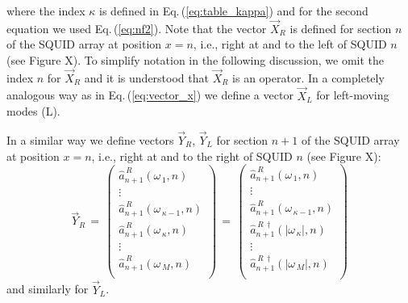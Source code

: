 %
where the index $\kappa$ is defined in Eq.\,(\ref{eq:table_kappa}) and for the second equation we used
Eq.\,(\ref{eq:nf2}). 
Note that the vector $\vec{X}_R$ is defined for section $n$ of the SQUID array at position $x=n$, i.e.,
right at and to the left of SQUID $n$
%
\color{red}
(see Figure X).
\color{black}
%
To simplify notation in the following discussion, we omit the index $n$ for $\vec{X}_R$ and it is 
understood that $\vec{X}_R$ is an operator. 
In a completely analogous way as in Eq.\,(\ref{eq:vector_x}) we define a vector $\vec{X}_L$ for 
left-moving modes (L). 

In a similar way we define vectors $\vec{Y}_R$, $\vec{Y}_L$
for section $n+1$ of the SQUID array at position $x=n$, i.e., right at and to the right of SQUID $n$
%
\color{red}
(see Figure X):
\color{black}
%
\begin{equation} \label{eq:vector_y}
\vec{Y}_R \, = \, 
\begin{pmatrix}
\hat{a}_{n+1}^{\,R}(\omega_{\,1},n) \\
\vdots \\
\hat{a}_{n+1}^{\,R}(\omega_{\,\kappa-1},n) \\
\hat{a}_{n+1}^{\,R}(\omega_{\,\kappa},n) \\
\vdots \\
\hat{a}_{n+1}^{\,R}(\omega_{\,M},n) \\
\end{pmatrix}
\, = \,
\begin{pmatrix}
\hat{a}_{n+1}^{\,R}(\omega_{\,1},n) \\
\vdots \\
\hat{a}_{n+1}^{\,R}(\omega_{\,\kappa-1},n) \\
\hat{a}_{n+1}^{\,R\,\dagger}(|\omega_{\,\kappa}|,n) \\
\vdots \\
\hat{a}_{n+1}^{\,R\,\dagger}(|\omega_{\,M}|,n) \\
\end{pmatrix}
\end{equation}
%
and similarly for $\vec{Y}_L$. 

